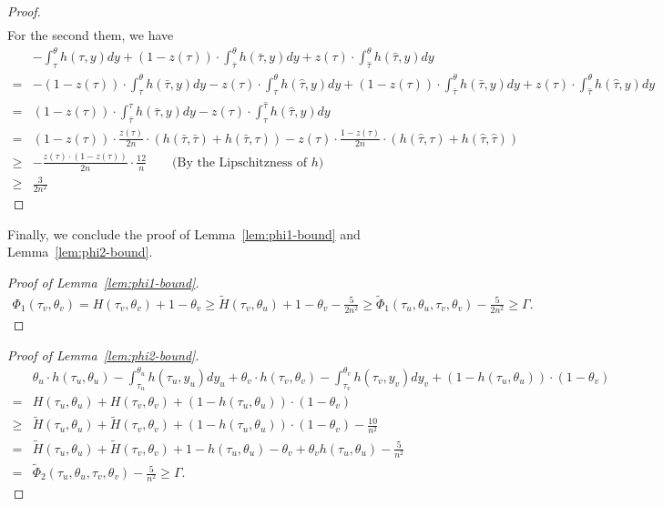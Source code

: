 \begin{proof}
\begin{align*}
    \end{align*}
    For the second them, we have 
    \begin{align*}
        & - \int_{\tau}^{\theta} h(\tau,y)dy + (1-z(\tau)) \cdot \int_{\bar{\tau}}^{\theta} h(\bar{\tau},y)dy + z(\tau) \cdot \int_{\hat{\tau}}^{\theta} h(\hat{\tau},y)dy \\
        = & - (1-z(\tau)) \cdot \int_{\tau}^{\theta} h(\bar{\tau},y)dy - z(\tau) \cdot \int_{\tau}^{\theta} h(\hat{\tau},y)dy + (1-z(\tau)) \cdot \int_{\bar{\tau}}^{\theta} h(\bar{\tau},y)dy + z(\tau) \cdot \int_{\hat{\tau}}^{\theta} h(\hat{\tau},y)dy \\
        = & (1-z(\tau)) \cdot \int_{\bar{\tau}}^{\tau} h(\bar{\tau},y)dy  - z(\tau) \cdot \int_{\tau}^{\hat{\tau}} h(\hat{\tau},y)dy \\
        = & (1-z(\tau)) \cdot \frac{z(\tau)}{2n} \cdot(h(\bar{\tau},\bar{\tau}) + h(\bar{\tau},\tau))  - z(\tau) \cdot \frac{1-z(\tau)}{2n} \cdot(h(\hat{\tau},\tau) + h(\hat{\tau},\hat{\tau}))\\
        \geq & -\frac{z(\tau)\cdot(1-z(\tau))}{2n}\cdot \frac{12}{n} \qquad \text{(By the Lipschitzness of $h$)} \\
        \geq & \frac{3}{2n^2} 
    \end{align*}
\end{proof}

Finally, we conclude the proof of Lemma~\ref{lem:phi1-bound} and Lemma~\ref{lem:phi2-bound}.
\begin{proof}[Proof of Lemma~\ref{lem:phi1-bound}]
\begin{align*}
    \Phi_1(\tau_v,\theta_v)
    = H(\tau_v,\theta_v) + 1 - \theta_v
    \geq \tilde{H}(\tau_v,\theta_u) + 1 - \theta_v - \frac{5}{2n^2} \geq \tilde{\Phi}_1(\tau_u,\theta_u,\tau_v,\theta_v) - \frac{5}{2n^2} \geq \Gamma.
\end{align*}
\end{proof}
\begin{proof}[Proof of Lemma~\ref{lem:phi2-bound}]
\begin{align*}
    &\theta_u \cdot h(\tau_u, \theta_u) - \int_{\tau_u}^{\theta_u} h(\tau_u, y_u) dy_u + \theta_v \cdot h(\tau_v, \theta_v) - \int_{\tau_v}^{\theta_v} h(\tau_v, y_v) dy_v + (1-h(\tau_u, \theta_u)) \cdot (1-\theta_v) \\
    =& H(\tau_u,\theta_u) + H(\tau_v,\theta_v) + (1-h(\tau_u,\theta_u))\cdot(1-\theta_v)\\
    \geq& \tilde{H}(\tau_u,\theta_u) + \tilde{H}(\tau_v,\theta_v) + (1-h(\tau_u,\theta_u))\cdot(1-\theta_v) - \frac{10}{n^2}\\
    =& \tilde{H}(\tau_u,\theta_u) + \tilde{H}(\tau_v,\theta_v) + 1-h(\tau_u,\theta_u) -\theta_v + \theta_v h(\tau_u,\theta_u) - \frac{5}{n^2} \\
    =& \tilde{\Phi}_2(\tau_u,\theta_u,\tau_v,\theta_v) - \frac{5}{n^2} \geq \Gamma.
\end{align*}
\end{proof}








